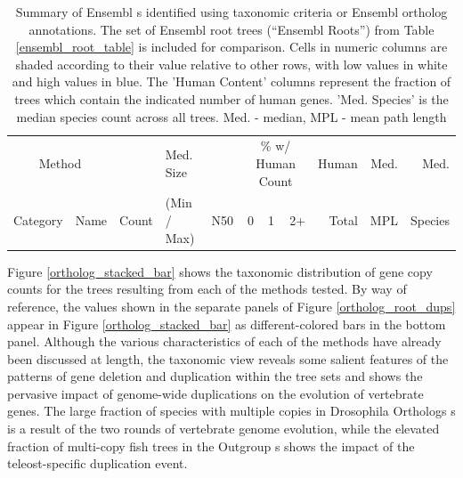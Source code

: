 \begin{landscape}
\begin{table}[ht]
\centering
\begin{tabular}{llrb{2.5cm}rrrrrrr}
\toprule
\multicolumn{2}{c}{Method} & &  Med. Size &  & \multicolumn{3}{c}{\% w/ Human Count} & Human & Med. & Med. \\ \cmidrule(r){6-8} \cmidrule(r){1-2}
Category & Name & Count  & (Min / Max) & N50 & 0 & 1 & 2+ & Total & MPL & Species \\ 
  \midrule

\bottomrule
\end{tabular}
\caption{Summary of Ensembl \subtr{}s identified using taxonomic
  criteria or Ensembl ortholog annotations. The set of Ensembl root
  trees (``Ensembl Roots'') from Table \ref{ensembl_root_table} is
  included for comparison. Cells in numeric columns are shaded
  according to their value relative to other rows, with low values in
  white and high values in blue. The 'Human Content' columns represent
  the fraction of trees which contain the indicated number of human
  genes. 'Med. Species' is the median species count across all
  trees. Med. - median, MPL - mean path length}
\label{ensembl_subtree_table}
\end{table}
\end{landscape}

Figure \ref{ortholog_stacked_bar} shows the taxonomic distribution of
gene copy counts for the trees resulting from each of the \subtr
methods tested. By way of reference, the values shown in the separate
panels of Figure \ref{ortholog_root_dups} appear in Figure
\ref{ortholog_stacked_bar} as different-colored bars in the bottom
panel. Although the various characteristics of each of the \subtr
methods have already been discussed at length, the taxonomic view
reveals some salient features of the patterns of gene deletion and
duplication within the tree sets and shows the pervasive impact of
genome-wide duplications on the evolution of vertebrate genes. The
large fraction of species with multiple copies in Drosophila Orthologs
\subtr{}s is a result of the two rounds of vertebrate genome
evolution, while the elevated fraction of multi-copy fish trees in the
Outgroup \subtr{}s shows the impact of the teleost-specific
duplication event.

